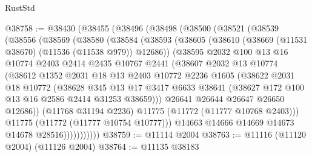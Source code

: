 \begin{lexlean}{RustStd}
\begin{coremodule}
@38758 := @38430
    (@38455
      (@38496
        (@38498
          (@38500
            (@38521
              (@38539
                (@38556
                  (@38569
                    (@38580
                      (@38584
                        (@38593
                          (@38605
                            (@38610 (@38669 (@11531 @38670) (@11536 (@11538 @979)) @12686))
                            (@38595
                              @2032
                              @100
                              @13
                              @16
                              @10774
                              @2403
                              @2414
                              @2435
                              @10767
                              @2441
                              (@38607
                                @2032
                                @13
                                @10774
                                (@38612
                                  @1352
                                  @2031
                                  @18
                                  @13
                                  @2403
                                  @10772
                                  @2236
                                  @1605
                                  (@38622
                                    @2031
                                    @18
                                    @10772
                                    (@38628
                                      @345
                                      @13
                                      @17
                                      @3417
                                      @6633
                                      @38641
                                      (@38627 @172 @100 @13 @16 @2586 @2414 @31253 @38659)))
                                  @26641
                                  @26644
                                  @26647
                                  @26650
                                  @12686))
                              (@11768 @31194 @2236)
                              @11775
                              (@11772 (@11777 @10768 @2403)))
                            @11775
                            (@11772 (@11777 @10754 @10777)))
                          @14663
                          @14666
                          @14669
                          @14673
                          @14678
                          @28516)))))))))))
@38759 := @11114 @2004
@38763 := @11116 (@11120 @2004) (@11126 @2004)
@38764 := @11135 @38183

\end{coremodule}
\end{lexlean}
